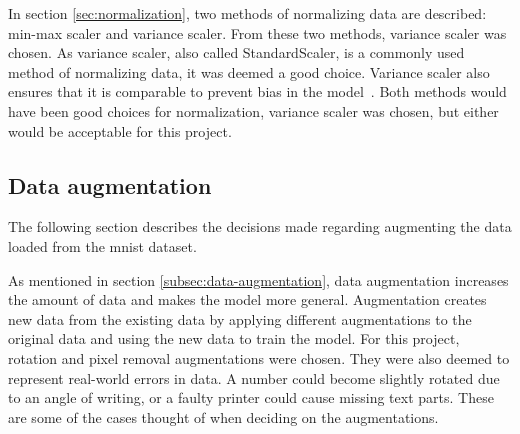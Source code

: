 In section \ref{sec:normalization}, two methods of normalizing data are described: min-max scaler and variance scaler. From these two methods, variance scaler was chosen. As variance scaler, also called StandardScaler, is a commonly used method of normalizing data, it was deemed a good choice. Variance scaler also ensures that it is comparable to prevent bias in the model~\cite{StandardScaler-towardsAi}. Both methods would have been good choices for normalization, variance scaler was chosen, but either would be acceptable for this project.

\subsection{Data augmentation}
The following section describes the decisions made regarding augmenting the data loaded from the \gls{mnist} dataset.

As mentioned in section \ref{subsec:data-augmentation}, data augmentation increases the amount of data and makes the model more general. Augmentation creates new data from the existing data by applying different augmentations to the original data and using the new data to train the model. For this project, rotation and pixel removal augmentations were chosen. They were also deemed to represent real-world errors in data. A number could become slightly rotated due to an angle of writing, or a faulty printer could cause missing text parts. These are some of the cases thought of when deciding on the augmentations.



